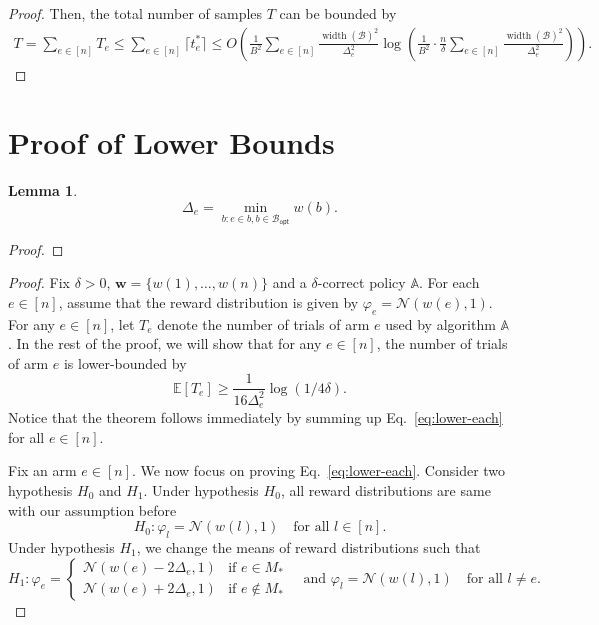 \documentclass{article}
\newtheorem{lemma}{Lemma}
\newcommand{\Rew}{\varphi}
\newcommand{\E}{\mathbb E}
\newcommand{\B}{\mathcal B}
\newcommand{\Bopt}{\mathcal B_{\mathsf{opt}}}
\DeclareMathOperator{\rank}{width}
\renewcommand{\vec}[1]{\boldsymbol{#1}}
\begin{document}
\begin{spacing}{1.1}
\begin{proof}
Then, the total number of samples $T$ can be bounded by
\begin{align*}
T = \sum_{e\in [n]} T_e \le \sum_{e\in [n]} \lceil t_e^* \rceil \le 
O\left(\frac{1}{B^2}\sum_{e\in [n]} \frac{\rank(\B)^2}{\Delta_e^2} \log\left(\frac{1}{B^2}\cdot \frac{n}{\delta} \sum_{e\in[n]}\frac{\rank(\B)^2}{\Delta_e^2} \right)\right).
\end{align*}

\end{proof}



\section{Proof of Lower Bounds}

\begin{lemma}
$$
\Delta_e = \min_{b: e \in b, b \in \Bopt} w(b).
$$
\end{lemma}

\begin{proof}
\end{proof}


\begin{proof}
Fix $\delta >0$, $\vec w =\{w(1),\ldots,w(n)\}$ and a $\delta$-correct policy $\mathbb A$.
For each $e\in [n]$, assume that the reward distribution is given by $\Rew_e=\mathcal N(w(e),1)$.
For any $e\in [n]$, let $T_e$ denote the  number of trials of arm $e$ used by algorithm $\mathbb A$.
In the rest of the proof, we will show that for any $e\in [n]$, the number of trials of arm $e$ is lower-bounded by
\begin{equation}
\E[T_e] \ge \frac{1}{16\Delta_e^2}\log(1/4\delta).
\label{eq:lower-each}
\end{equation}
Notice that the theorem follows immediately by summing up Eq.~\eqref{eq:lower-each} for all $e\in[n]$.


Fix an arm $e\in [n]$. We now focus on proving Eq.~\eqref{eq:lower-each}.
Consider two hypothesis $H_0$ and $H_1$. 
Under hypothesis $H_0$, all reward distributions are same with our assumption before
$$
H_0: \Rew_l = \mathcal N(w(l),1) \quad \text{for all } l \in [n].
$$
Under hypothesis $H_1$, we change the means of reward distributions such that 
$$
H_1: 
	\Rew_e = \begin{cases}
	\mathcal N(w(e)-2\Delta_e,1) & \text{if } e\in M_*\\
	\mathcal N(w(e)+2\Delta_e,1) & \text{if } e\not\in M_*
\end{cases} 
\quad\text{and } \Rew_l=\mathcal N(w(l), 1) \quad\text{for all } l\not = e.
$$


\end{proof}
\end{spacing}
\end{document}
